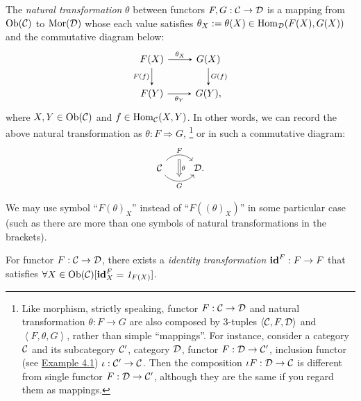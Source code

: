 \documentclass{article}
\begin{document}
\begin{defi}\label{natural transformation}
	The \emph{natural transformation} $\theta$ between functors $F,G:\mathcal{C}\to\mathcal{D}$ is a mapping from $\mathrm{Ob}(\mathcal{C})$ to $\mathrm{Mor}(\mathcal{D})$ whose each value satisfies $\theta_X:=\theta(X)\in\mathrm{Hom}_{\mathcal{D}}(F(X),G(X))$ and the commutative diagram below:
	\begin{equation}\begin{tikzcd}\label{ntr}
		F(X) \arrow[->,>=stealth,r,"\theta_X"] \arrow[->,>=stealth,d,"F(f)"'] & G(X) \arrow[->,>=stealth,d,"G(f)"]\\
		F(Y) \arrow[->,>=stealth,r,"\theta_Y"'] & G(Y),
	\end{tikzcd}\end{equation}
	where $X,Y\in\mathrm{Ob}(\mathcal{C})$ and $f\in\mathrm{Hom}_{\mathcal{C}}(X,Y)$. In other words, we can record the above natural transformation as $\theta:F\Rightarrow G$,
		\footnote{Like morphism, strictly speaking, functor $F:\mathcal{C}\to\mathcal{D}$ and natural transformation $\theta:F\to G$ are also composed by 3-tuples $\left<\mathcal{C},F,\mathcal{D}\right>$ and $\left<F,\theta,G\right>$, rather than simple ``mappings''. For instance, consider a category $\mathcal{C}$ and its subcategory $\mathcal{C}'$, category $\mathcal{D}$, functor $F:\mathcal{D}\to\mathcal{C}'$, inclusion functor (see \hyperref[func]{Example 4.1}) $\iota:\mathcal{C}'\to\mathcal{C}$. Then the composition $\iota F:\mathcal{D}\to\mathcal{C}$ is different from single functor $F:\mathcal{D}\to\mathcal{C}'$, although they are the same if you regard them as mappings.}
	or in such a commutative diagram:
	\[\begin{tikzcd}
			\ca \arrow[r, "F", bend left=50, ""' name=F] \arrow[r, "G"', bend right=50, "" name=G] & \arrow[Rightarrow, from=F, to=G, "\theta"] \D.
	\end{tikzcd}\]
	
	We may use symbol ``$F(\theta)_X$'' instead of ``$F((\theta)_X)$'' in some particular case (such as there are more than one symbols of natural transformations in the brackets).
	
	For functor $F:\mathcal{C}\to\mathcal{D}$, there exists a \emph{identity transformation} $\mathbf{id}^F:F\to F$ that satisfies $\forall X\in\mathrm{Ob}(\mathcal{C})[\mathbf{id}^F_X=\mathit{1}_{F(X)}]$.
\end{defi}
\end{document}
